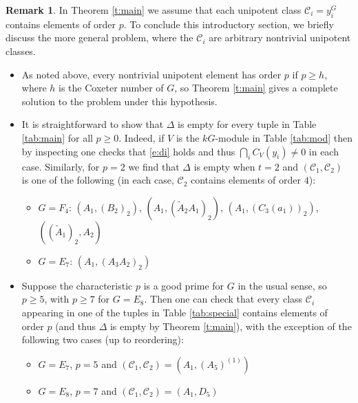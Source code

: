 \documentclass[twoside,a4paper,reqno,11pt]{amsart}
\newcommand{\<}{\langle}
\renewcommand{\>}{\rangle}
\newcommand{\geqs}{\geqslant}
\renewcommand{\:}{\colon}
\theoremstyle{plain}
\theoremstyle{definition}
\newtheorem{remk}{Remark}
\begin{document}
\begin{remk}\label{r:prime}
In Theorem \ref{t:main} we assume that each unipotent class $\mathcal{C}_i = y_i^G$ contains elements of order $p$. To conclude this introductory section, we briefly discuss the more general problem, where the $\mathcal{C}_i$ are arbitrary nontrivial unipotent classes.
\begin{itemize}\addtolength{\itemsep}{0.2\baselineskip}
\item[{\rm (a)}] As noted above, every nontrivial unipotent element has order $p$ if 
$p \geqs h$, where $h$ is the Coxeter number of $G$, so Theorem \ref{t:main} gives a complete solution to the problem under this hypothesis.
\item[{\rm (b)}] It is straightforward to show that $\Delta$ is empty for every tuple in Table \ref{tab:main} for all $p \geqs 0$. Indeed, if $V$ is the $kG$-module in Table \ref{tab:mod} then by inspecting \cite{Law1} one checks that \eqref{e:di} holds and thus $\bigcap_i C_V(y_i) \ne 0$ in each case. Similarly, for $p=2$ we find that $\Delta$ is empty when $t=2$ and $(\mathcal{C}_1,\mathcal{C}_2)$ is one of the following (in each case, $\mathcal{C}_2$ contains elements of order $4$):

\vspace{1mm}

\begin{itemize}\addtolength{\itemsep}{0.2\baselineskip}
\item $G = F_4$: $(A_1,(B_2)_2)$, $(A_1,(\tilde{A}_2A_1)_2)$, $(A_1,(C_3(a_1))_2)$, $((\tilde{A}_1)_2, A_2)$
\item$G = E_7$: $(A_1,(A_3A_2)_2)$
\end{itemize}
\item[{\rm (c)}] Suppose the characteristic $p$ is a good prime for $G$ in the usual sense, so $p \geqs 5$, with $p \geqs 7$ for $G = E_8$. Then one can check that every class $\mathcal{C}_i$ appearing in one of the tuples in Table \ref{tab:special} contains elements of order $p$ (and thus $\Delta$ is empty by Theorem \ref{t:main}), with the exception of the following two cases (up to reordering):

\vspace{1mm}

\begin{itemize}\addtolength{\itemsep}{0.2\baselineskip}
\item $G = E_7$, $p=5$ and $(\mathcal{C}_1,\mathcal{C}_2) = (A_1,(A_5)^{(1)})$
\item $G = E_8$, $p=7$ and $(\mathcal{C}_1,\mathcal{C}_2) = (A_1,D_5)$
\end{itemize}


\end{itemize}
\end{remk}
\end{document}

